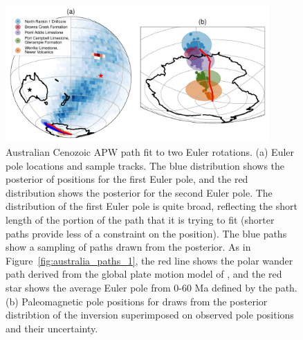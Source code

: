 \documentclass[preprint,12pt,authoryear]{elsarticle}
\begin{document}
\begin{figure}
\includegraphics[width=0.9\textwidth]{figures/australia/australia_paths_2.pdf}
\caption[Australian Cenozoic APW path fit to two Euler rotations.]{Australian Cenozoic APW path fit to two Euler rotations. 
(a) Euler pole locations and sample tracks. The blue distribution shows the posterior of positions for the first Euler pole, and the red distribution shows the posterior for the second Euler pole. The distribution of the first Euler pole is quite broad, reflecting the short length of the portion of the path that it is trying to fit (shorter paths provide less of a constraint on the position). The blue paths show a sampling of paths drawn from the posterior. As in Figure~\ref{fig:australia_paths_1}, the red line shows the polar wander path derived from the global plate motion model of \citet{seton2012global}, and the red star shows the average Euler pole from 0-60 Ma defined by the \citet{seton2012global} path.
(b) Paleomagnetic pole positions for draws from the posterior distribtion of the inversion superimposed on observed pole positions and their uncertainty.}
\label{fig:australia_paths_2}
\end{figure}
\end{document}
